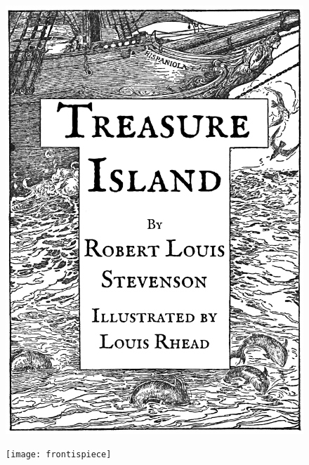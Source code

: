 \documentclass[
paper=a5,
BCOR=7mm,
twoside,
DIV=calc,
11pt,
usegeometry,
chapterprefix,
headings=big]{scrbook} %
\begin{document}
\renewcommand*{\chaptermarkformat}{}
\renewcommand*{\chapterheadendvskip}{\vspace{10pt}}
\renewcommand*{\chapterheadstartvskip}{\vspace{0pt}}

\frontmatter
\pagestyle{empty}

  \recalctypearea
 \vfill
 \begin{figure}[p!]
\centering
\includegraphics[width=\linewidth]{titlepage}
\end{figure}
\vfill

\clearpage


 \vfill
 \begin{figure}[p!]
\centering
\texttt{[image: frontispiece]}
\caption[\textbf{Frontispiece}]{}
\end{figure}
\vfill
\thispagestyle{empty}
\end{document}
